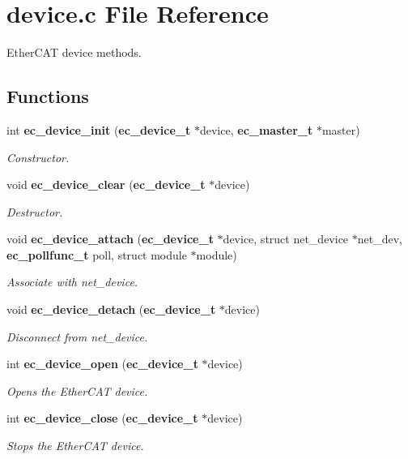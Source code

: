 \section{device.\-c \-File \-Reference}
\label{device_8c}


\-Ether\-C\-A\-T device methods.  


\subsection*{\-Functions}
\begin{DoxyCompactItemize}
\item 
int {\bf ec\-\_\-device\-\_\-init} ({\bf ec\-\_\-device\-\_\-t} $\ast$device, {\bf ec\-\_\-master\-\_\-t} $\ast$master)
\begin{DoxyCompactList}\small\item\em \-Constructor. \end{DoxyCompactList}\item 
void {\bf ec\-\_\-device\-\_\-clear} ({\bf ec\-\_\-device\-\_\-t} $\ast$device)
\begin{DoxyCompactList}\small\item\em \-Destructor. \end{DoxyCompactList}\item 
void {\bf ec\-\_\-device\-\_\-attach} ({\bf ec\-\_\-device\-\_\-t} $\ast$device, struct net\-\_\-device $\ast$net\-\_\-dev, {\bf ec\-\_\-pollfunc\-\_\-t} poll, struct module $\ast$module)
\begin{DoxyCompactList}\small\item\em \-Associate with net\-\_\-device. \end{DoxyCompactList}\item 
void {\bf ec\-\_\-device\-\_\-detach} ({\bf ec\-\_\-device\-\_\-t} $\ast$device)
\begin{DoxyCompactList}\small\item\em \-Disconnect from net\-\_\-device. \end{DoxyCompactList}\item 
int {\bf ec\-\_\-device\-\_\-open} ({\bf ec\-\_\-device\-\_\-t} $\ast$device)
\begin{DoxyCompactList}\small\item\em \-Opens the \-Ether\-C\-A\-T device. \end{DoxyCompactList}\item 
int {\bf ec\-\_\-device\-\_\-close} ({\bf ec\-\_\-device\-\_\-t} $\ast$device)
\begin{DoxyCompactList}\small\item\em \-Stops the \-Ether\-C\-A\-T device. \end{DoxyCompactList}\item 

\end{DoxyCompactItemize}
